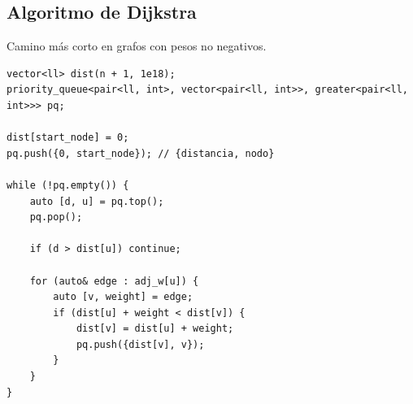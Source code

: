 \documentclass[11pt, a4paper]{article}
\begin{document}
\subsection{Algoritmo de Dijkstra}
Camino más corto en grafos con pesos no negativos.
\begin{lstlisting}
vector<ll> dist(n + 1, 1e18);
priority_queue<pair<ll, int>, vector<pair<ll, int>>, greater<pair<ll, int>>> pq;

dist[start_node] = 0;
pq.push({0, start_node}); // {distancia, nodo}

while (!pq.empty()) {
    auto [d, u] = pq.top();
    pq.pop();

    if (d > dist[u]) continue;

    for (auto& edge : adj_w[u]) {
        auto [v, weight] = edge;
        if (dist[u] + weight < dist[v]) {
            dist[v] = dist[u] + weight;
            pq.push({dist[v], v});
        }
    }
}
\end{lstlisting}
\end{document}
